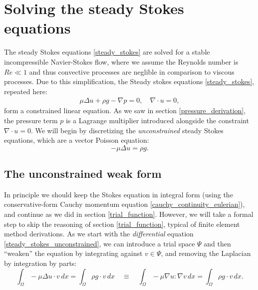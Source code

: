\documentclass[11pt,a4paper]{memoir}
\begin{document}
\section{Solving the steady Stokes equations}
The steady Stokes equations \eqref{steady_stokes} are solved for a stable incompressible Navier-Stokes flow,
where we assume the Reynolds number is $Re \ll 1$ and thus convective processes are neglible in comparison to viscous processes.
Due to this simplification, the Steady stokes equations \eqref{steady_stokes}, repeated here:
\begin{align*}
    \mu\Delta u + \rho g - \nabla p = 0,\quad \nabla\cdot u = 0,
\end{align*}
form a constrained linear equation. As we saw in section \ref{pressure_derivation}, the pressure term $p$ is a Lagrange multiplier introduced
alongside the constraint $\nabla\cdot u = 0$. We will begin by discretizing the \textit{unconstrained} steady Stokes equations,
which are a vector Poisson equation:
\begin{equation}\label{steady_stokes_unconstrained}
    -\mu\Delta u = \rho g.
\end{equation}

\subsection{The unconstrained weak form}
In principle we should keep the Stokes equation
in integral form (using the conservative-form Cauchy momentum equation \eqref{cauchy_continuity_eulerian}), and continue as we did
in section \ref{trial_function}. However,
we will take a formal step to skip the reasoning of section \ref{trial_function}, typical of finite element method derivations.
As we start with the \textit{differential} equation \eqref{steady_stokes_unconstrained}, we can introduce a trial space $\Psi$ and then ``weaken''
the equation by integrating against $v \in \Psi$, and removing the Laplacian by integration by parts:
\begin{equation}\label{steady_stokes_unconstrained_weak}
    \int_\Omega -\mu\Delta u\cdot v\,dx = \int_\Omega \rho g\cdot v\,dx
    \quad\equiv\quad
    \int_\Omega -\mu\nabla u : \nabla v\,dx = \int_\Omega \rho g\cdot v\,dx.
\end{equation}
\end{document}

